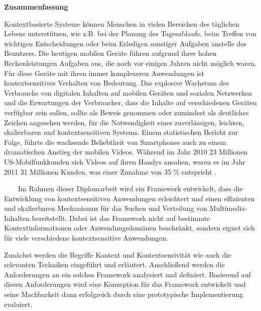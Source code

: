 \thispagestyle{empty}
\vspace*{0.2cm}

\begin{center}
    \textbf{Zusammenfassung}
\end{center}

\vspace*{0.2cm}

\noindent 
Kontextbasierte Systeme k\"onnen Menschen in vielen Bereichen des t\"aglichen Lebens unterst\"utzen, wie z.B. bei der Planung des Tagesablaufs, beim Treffen von wichtigen Entscheidungen oder beim Erledigen sonstiger Aufgaben anstelle des Benutzers. Die heutigen mobilen Ger\"ate f\"uhren aufgrund ihrer hohen Rechenleistungen Aufgaben aus, die noch vor einigen Jahren nicht m\"oglich waren. F\"ur diese Ger\"ate mit ihren immer komplexeren Anwendungen ist kontextsensitives Verhalten von Bedeutung. Das explosive Wachstum des Verbrauchs von digitalen Inhalten auf mobilen Geräten und sozialen Netzwerken und die Erwartungen der Verbraucher, dass die Inhalte auf verschiedenen Ger\"aten verf\"ugbar sein sollen, sollte als Beweis genommen oder zumindest als deutliches Zeichen angesehen werden, für die Notwendigkeit eines zuverl\"assigen, leichten, skalierbaren und kontextsensitiven Systems. Einem statistischen Bericht zur Folge, führte die wachsende Beliebtheit von Smartphones auch zu einem dramatischen Anstieg der mobilen Videos. W\"ahrend im Jahr 2010 23 Millionen US-Mobilfunkkunden sich Videos auf ihren Handys ansahen, waren es im Jahr 2011 31 Millionen Kunden, was einer Zunahme von 35 \% entspricht \cite{mobile-media-report}.

\ \
\ \
Im Rahmen dieser Diplomarbeit wird ein Framework entwickelt, dass die Entwicklung von kontextsensitiven Anwendungen erleichtert und einen effizienten und skalierbaren Mechanismus für das Suchen und Verteilung von Multimedia-Inhalten bereitstellt. Dabei ist das Framework nicht auf bestimmte Kontextinformationen oder Anwendungsdom\"anen beschr\"ankt, sondern eignet sich für viele verschiedene kontextsensitive Anwendungen.

Zun\"achst werden die Begriffe Kontext und Kontextsensivit\"at wie auch die relevanten Techniken eingef\"uhrt und erl\"autert. Anschlie{\ss}end werden die Anforderungen an ein solches Framework analysiert und definiert. Basierend auf diesen Anforderungen wird eine Konzeption für das Framework entwickelt und seine Machbarkeit dann erfolgreich durch eine prototypische Implementierung evaluiert.

